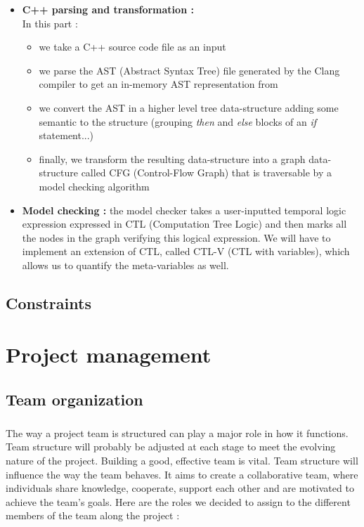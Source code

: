\documentclass{report}
\begin{document}
\vspace{1.5mm}
\begin{itemize}
\item \textbf{C++ parsing and transformation :}
\\
In this part :
\begin{itemize}
 \item we take a C++ source code file as an
 input
\item we parse the AST (Abstract Syntax Tree) file generated by the Clang compiler to get an in-memory 
AST representation from
\item we convert the AST in a higher level tree data-structure adding some semantic to the structure (grouping
\textit{then} and \textit{else} blocks of an \textit{if} statement...)
 \item finally, we transform the resulting data-structure into a graph data-structure called CFG (Control-Flow Graph) that is 
traversable by a model checking algorithm
\end{itemize}\vspace{1mm}
\item \textbf{Model checking :} the model checker takes a user-inputted temporal
 logic expression expressed in CTL (Computation Tree Logic) and then marks all the nodes in the graph verifying this
 logical expression. We will have to implement an extension of 
CTL, called CTL-V (CTL with variables), which allows us to quantify the meta-variables as well.\vspace{1mm}
\end{itemize}

\section{Constraints}

\chapter{Project management}

\section{Team organization}

\paragraph{}
\hspace{4mm}The way a project team is structured can play a major role in 
how it functions. Team structure will probably be adjusted at 
each stage to meet the evolving nature of the project. 
Building a good, effective team is vital. Team structure will 
influence the way the team behaves. It aims to create a 
collaborative team, where individuals share knowledge, 
cooperate, support each other and are motivated to achieve 
the team's goals. Here are the roles we decided to assign to the different members of the team along the project :
\end{document}

